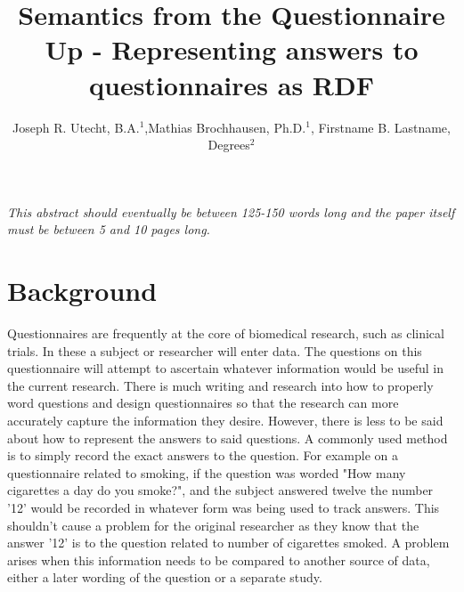 \documentclass{amia}
\begin{document}
\title{Semantics from the Questionnaire Up - Representing answers to questionnaires as RDF }

\author{Joseph R. Utecht, B.A.$^{1}$,Mathias Brochhausen, Ph.D.$^{1}$, Firstname B. Lastname, Degrees$^{2}$}


\maketitle


\textit{This abstract should eventually be between 125-150 words long and the paper itself must be between 5 and 10 pages long.}

\section*{Background}
Questionnaires are frequently at the core of biomedical research, such as clinical trials. In these a subject or researcher will enter data.
The questions on this questionnaire will attempt to ascertain whatever information would be useful in the current research.
There is much writing and research into how to properly word questions and design questionnaires so that the research can more accurately capture the information they desire.
However, there is less to be said about how to represent the answers to said questions.
A commonly used method is to simply record the exact answers to the question.
For example on a questionnaire related to smoking, if the question was worded "How many cigarettes a day do you smoke?", and the subject answered twelve the number '12' would be recorded in whatever form was being used to track answers.
This shouldn't cause a problem for the original researcher as they know that the answer '12' is to the question related to number of cigarettes smoked.
A problem arises when this information needs to be compared to another source of data, either a later wording of the question or a separate study.
\end{document}
